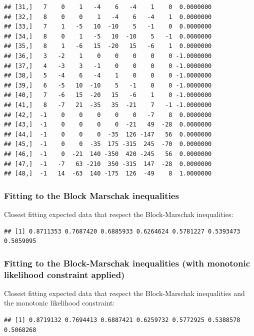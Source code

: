 \documentclass[]{article}
\begin{document}
\begin{verbatim}
## [31,]   7    0    1   -4    6   -4    1    0  0.0000000
## [32,]   8    0    0    1   -4    6   -4    1  0.0000000
## [33,]   7    1   -5   10  -10    5   -1    0  0.0000000
## [34,]   8    0    1   -5   10  -10    5   -1  0.0000000
## [35,]   8    1   -6   15  -20   15   -6    1  0.0000000
## [36,]   3   -2    1    0    0    0    0    0 -1.0000000
## [37,]   4   -3    3   -1    0    0    0    0 -1.0000000
## [38,]   5   -4    6   -4    1    0    0    0 -1.0000000
## [39,]   6   -5   10  -10    5   -1    0    0 -1.0000000
## [40,]   7   -6   15  -20   15   -6    1    0 -1.0000000
## [41,]   8   -7   21  -35   35  -21    7   -1 -1.0000000
## [42,]  -1    0    0    0    0    0   -7    8  0.0000000
## [43,]  -1    0    0    0    0  -21   49  -28  0.0000000
## [44,]  -1    0    0    0  -35  126 -147   56  0.0000000
## [45,]  -1    0    0  -35  175 -315  245  -70  0.0000000
## [46,]  -1    0  -21  140 -350  420 -245   56  0.0000000
## [47,]  -1   -7   63 -210  350 -315  147  -28  0.0000000
## [48,]  -1   14  -63  140 -175  126  -49    8  1.0000000
\end{verbatim}

\subsubsection{Fitting to the Block Marschak
inequalities}\label{fitting-to-the-block-marschak-inequalities}

Closest fitting expected data that respect the Block-Marschak
inequalities:

\begin{verbatim}
## [1] 0.8711353 0.7687420 0.6885933 0.6264624 0.5781227 0.5393473 0.5059095
\end{verbatim}

\subsubsection{Fitting to the Block-Marschak inequalities (with
monotonic likelihood constraint
applied)}\label{fitting-to-the-block-marschak-inequalities-with-monotonic-likelihood-constraint-applied}

Closest fitting expected data that respect the Block-Marschak
inequalities and the monotonic likelihood constraint:

\begin{verbatim}
## [1] 0.8719132 0.7694413 0.6887421 0.6259732 0.5772925 0.5388578 0.5068268
\end{verbatim}
\end{document}
